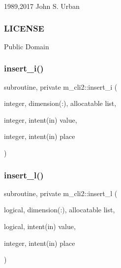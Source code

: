 1989,2017 John S. Urban \subsubsection*{L\+I\+C\+E\+N\+SE}

Public Domain \mbox{\label{namespacem__cli2_afa6f00a57f1252ba5daa0c440a23ffbb}} 
\subsubsection{\texorpdfstring{insert\+\_\+i()}{insert\_i()}}
{\footnotesize\ttfamily subroutine, private m\+\_\+cli2\+::insert\+\_\+i (\begin{DoxyParamCaption}\item[{integer, dimension(\+:), allocatable}]{list,  }\item[{integer, intent(in)}]{value,  }\item[{integer, intent(in)}]{place }\end{DoxyParamCaption})\hspace{0.3cm}{\ttfamily [private]}}

\mbox{\label{namespacem__cli2_a7e5ee66813d8f6db9d48ebdc350a6b3e}} 
\subsubsection{\texorpdfstring{insert\+\_\+l()}{insert\_l()}}
{\footnotesize\ttfamily subroutine, private m\+\_\+cli2\+::insert\+\_\+l (\begin{DoxyParamCaption}\item[{logical, dimension(\+:), allocatable}]{list,  }\item[{logical, intent(in)}]{value,  }\item[{integer, intent(in)}]{place }\end{DoxyParamCaption})\hspace{0.3cm}{\ttfamily [private]}}

\mbox{\label{namespacem__cli2_a4c12c311327951984c6e1611da23cdfd}} 
